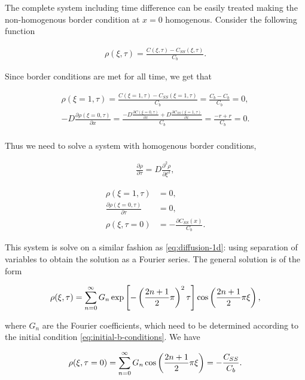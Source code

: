 The complete system including time difference can be easily treated making the non-homogenous border condition at $x=0$ homogenous. Consider the following function

\begin{align}
	\rho(\xi, \tau) = \frac{C(\xi,\tau)-C_{SS}(\xi, \tau)}{C_b}.
\end{align}

Since border conditions are met for all time, we get that 

\begin{align}
	\rho(\xi = 1, \tau) = \frac{C(\xi=1,\tau)-C_{SS}(\xi=1, \tau)}{C_b} = \frac{C_b - C_b}{C_b} = 0,\\
	-D\frac{\partial \rho(\xi = 0, \tau)}{\partial x} = \frac{-D\frac{\partial C(\xi=0,\tau)}{\partial x}+D\frac{\partial C_{SS}(\xi=1, \tau)}{\partial x}}{C_b} = \frac{-r + r}{C_b}=0.\\
\end{align}


Thus we need to solve a system with homogenous border conditions,

\begin{align}
	\frac{\partial \rho}{\partial \tau} = D\frac{\partial^2 \rho}{\partial \xi^2},
\end{align}

\begin{align}
	\rho(\xi = 1, \tau) &= 0, \\
	\frac{\partial\rho(\xi = 0, \tau)}{\partial \tau} &= 0, \\
	\rho(\xi, \tau = 0) &= -\frac{\partial C_{SS}(x)}{C_b}.
	\label{eq:initial-b-conditions}
\end{align}

This system is solve on a similar fashion as \ref{eq:diffusion-1d}: using separation of variables to obtain the solution as a Fourier series. The general solution is of the form

\begin{align}
	\rho(\xi, \tau) = \sum_{n=0}^{\infty} G_n \exp\left[{-\left({\frac{2n+1}{2}\pi}\right)^2\tau}\right]\cos\left({\frac{2n+1}{2}\pi\xi}\right),
\end{align}

where $G_n$ are the Fourier coefficients, which need to be determined according to the initial condition \ref{eq:initial-b-conditions}. We have

\begin{align}
	\rho(\xi, \tau = 0) = \sum_{n=0}^{\infty} G_n \cos\left({\frac{2n+1}{2}\pi\xi}\right) = -\frac{C_{SS}}{C_b}.
\end{align}


